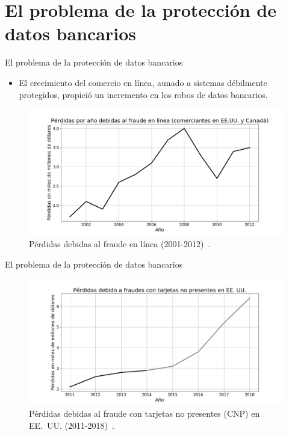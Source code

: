 %
%

\section{El problema de la protección de datos bancarios}

\begin{frame}{El problema de la protección de datos bancarios}
  \begin{itemize}
    \item El crecimiento del comercio en línea, aunado a sistemas débilmente
      protegidos, propició un incremento en los robos de datos bancarios.
  \end{itemize}

  \begin{figure}[H]
    \centering
    \includegraphics[width=0.9\linewidth]
       {diagramas_comunes/estadisticas_fraudes/perdidas_fraude_2002_2012.png}
    \caption{Pérdidas debidas al fraude en línea (2001-2012)~\cite{wallethub}.}
  \end{figure}
\end{frame}

\begin{frame}{El problema de la protección de datos bancarios}
  \begin{figure}[H]
    \centering
    \includegraphics[width=0.9\linewidth]
       {diagramas_comunes/estadisticas_fraudes/perdidas_fraude_2011_2018.png}
    \caption{Pérdidas debidas al fraude con tarjetas no presentes (CNP) en
              EE.~UU. (2011-2018)~\cite{creditcards}.}
  \end{figure}
\end{frame}

